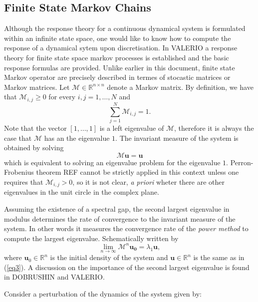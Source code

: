 \subsection*{Finite State Markov Chains}

Although the response theory for a continuous dynamical system is formulated within an infinite state space, one would like to know how to compute the response of a dynamical sytem upon discretisation. In VALERIO a response theory for finite state space markov processes is established and the basic response formulas are provided. Unlike earlier in this document, finite state Markov operator are precisely described in termes of stocastic matrices or Markov matrices. Let $\mathcal{M}\in \mathbb{R}^{n \times n}$ denote a Markov matrix. By definition, we have that $\mathcal{M}_{i,j}\geq 0$ for every $i,j=1,\ldots,N$ and
\begin{equation}
	\sum _{j=1}^{N}\mathcal{M}_{i,j}=1.
\end{equation}
Note that the vector $[1,\ldots , 1]$ is a left eigenvalue of $\mathcal{M}$, therefore it is always the case that $\mathcal{M}$ has an the eigenvalue $1$. The invariant measure of the system is obtained by solving
\begin{equation}\label{eq3}
	\mathcal{M}\mathbf{u}=\mathbf{u}
\end{equation}
which is equivalent to solving an eigenvalue problem for the eigenvalue $1$. Perron-Frobenius theorem REF cannot be strictly applied in this context unless one requires that $\mathcal{M}_{i,j}> 0$, so it is not clear, \emph{a priori} wheter there are other eigenvalues in the unit circle in the complex plane. 

Assuming the existence of a spectral gap, the second largest eigenvalue in modulus determines the rate of convergence to the invariant measure of the system. In other words it measures the convergence rate of the \emph{power method} to compute the largest eigenvalue. Schematically written by
\begin{equation}\label{powermethod}
\lim _{n\rightarrow \infty}\mathcal{M}^n\mathbf{u_0} = \lambda _1\mathbf{u},
\end{equation}
where $\mathbf{u}_0 \in \mathbb{R}^n$ is the initial density of the system and $\mathbf{u}\in \mathbb{R}^n$ is the same as in (\ref{eq3}). A discussion on the importance of the second largest eigenvalue is found in DOBRUSHIN and VALERIO.

Consider a perturbation of the dynamics of the system given by:

